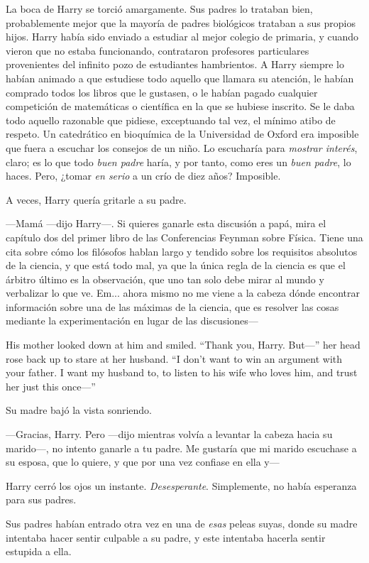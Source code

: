 La boca de Harry se torció amargamente. Sus padres lo trataban bien, probablemente mejor que la mayoría de padres biológicos trataban a sus propios hijos. Harry había sido enviado a estudiar al mejor colegio de primaria, y cuando vieron que no estaba funcionando, contrataron profesores particulares provenientes del infinito pozo de estudiantes hambrientos. A Harry siempre lo habían animado a que estudiese todo aquello que llamara su atención, le habían comprado todos los libros que le gustasen, o le habían pagado cualquier competición de matemáticas o científica en la que se hubiese inscrito. Se le daba todo aquello razonable que pidiese, exceptuando tal vez, el mínimo atibo de respeto. Un catedrático en bioquímica de la Universidad de Oxford era imposible que fuera a escuchar los consejos de un niño. Lo escucharía para \emph{mostrar interés}, claro; es lo que todo \emph{buen padre} haría, y por tanto, como eres un \emph{buen padre}, lo haces. Pero, ¿tomar \emph{en serio} a un crío de diez años? Imposible.

A veces, Harry quería gritarle a su padre.

—Mamá —dijo Harry—. Si quieres ganarle esta discusión a papá, mira el capítulo dos del primer libro de las Conferencias Feynman sobre Física. Tiene una cita sobre cómo los filósofos hablan largo y tendido sobre los requisitos absolutos de la ciencia, y que está todo mal, ya que la única regla de la ciencia es que el árbitro último es la observación, que uno tan solo debe mirar al mundo y verbalizar lo que ve. Em... ahora mismo no me viene a la cabeza dónde encontrar información sobre una de las máximas de la ciencia, que es resolver las cosas mediante la experimentación en lugar de las discusiones—

His mother looked down at him and smiled. “Thank you, Harry. But—” her head rose back up to stare at her husband. “I don’t want to win an argument with your father. I want my husband to, to listen to his wife who loves him, and trust her just this once—”

Su madre bajó la vista sonriendo.

—Gracias, Harry. Pero —dijo mientras volvía a levantar la cabeza hacia su marido—, no intento ganarle a tu padre. Me gustaría que mi marido escuchase a su esposa, que lo quiere, y que por una vez confiase en ella y—

Harry cerró los ojos un instante. \emph{Desesperante}. Simplemente, no había esperanza para sus padres.

Sus padres habían entrado otra vez en una de \emph{esas} peleas suyas, donde su madre intentaba hacer sentir culpable a su padre, y este intentaba hacerla sentir estupida a ella.

